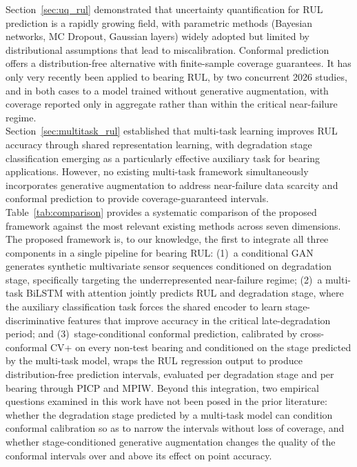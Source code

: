 \documentclass[review]{elsarticle}
\begin{document}
Section~\ref{sec:uq_rul} demonstrated that uncertainty quantification
for RUL prediction is a rapidly growing field, with parametric methods
(Bayesian networks, MC Dropout, Gaussian layers) widely adopted but
limited by distributional assumptions that lead to miscalibration.
Conformal prediction offers a distribution-free alternative with
finite-sample coverage guarantees. It has only very recently been
applied to bearing RUL, by two concurrent 2026 studies, and in both
cases to a model trained without generative augmentation, with coverage
reported only in aggregate rather than within the critical near-failure
regime.\\

Section~\ref{sec:multitask_rul} established that multi-task learning
improves RUL accuracy through shared representation learning,
with degradation stage classification emerging as a particularly
effective auxiliary task for bearing applications. However, no
existing multi-task framework simultaneously incorporates generative
augmentation to address near-failure data scarcity and conformal
prediction to provide coverage-guaranteed intervals.\\

Table~\ref{tab:comparison} provides a systematic comparison of the
proposed framework against the most relevant existing methods across
seven dimensions. The proposed framework is, to our knowledge, the
first to integrate all three components in a single pipeline for
bearing RUL: (1)~a conditional GAN generates synthetic multivariate
sensor sequences conditioned on degradation stage, specifically
targeting the underrepresented near-failure regime; (2)~a multi-task
BiLSTM with attention jointly predicts RUL and degradation stage,
where the auxiliary classification task forces the shared encoder to
learn stage-discriminative features that improve accuracy in the
critical late-degradation period; and (3)~stage-conditional conformal
prediction, calibrated by cross-conformal CV+ on every non-test
bearing and conditioned on the stage predicted by the multi-task
model, wraps the RUL regression output to produce distribution-free
prediction intervals, evaluated per degradation stage and per bearing
through PICP and MPIW. Beyond this integration, two empirical
questions examined in this work have not been posed in the prior
literature: whether the degradation stage predicted by a multi-task
model can condition conformal calibration so as to narrow the
intervals without loss of coverage, and whether stage-conditioned
generative augmentation changes the quality of the conformal
intervals over and above its effect on point accuracy.
\end{document}
